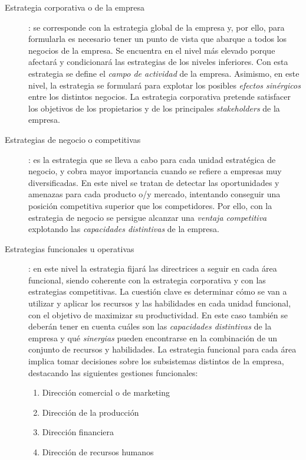 \documentclass[10pt,a4paper,spanish]{report}
\begin{document}
                  \begin{description}
                        \item[Estrategia corporativa o de la empresa]: se corresponde con la estrategia global de la empresa y, por ello, para formularla es necesario tener un punto de vista que abarque a todos los negocios de la empresa. Se encuentra en el nivel más elevado porque afectará y condicionará las estrategias de los niveles inferiores. Con esta estrategia se define el \textit{\textcolor[rgb]{0.4,0.9,0.6}{campo de actividad}} de la empresa. Asimismo, en este nivel, la estrategia se formulará para explotar los posibles \textit{\textcolor[rgb]{0.4,0.9,0.6}{efectos sinérgicos}} entre los distintos negocios. La estrategia corporativa pretende satisfacer los objetivos de los propietarios y de los principales \textit{\textcolor[rgb]{0.4,0.9,0.6}{stakeholders}} de la empresa.

                        \item[Estrategias de negocio o competitivas]: es la estrategia que se lleva a cabo para cada unidad estratégica de negocio, y cobra mayor importancia cuando se refiere a empresas muy diversificadas. En este nivel se tratan de detectar las oportunidades y amenazas para cada producto o/y mercado, intentando conseguir una posición competitiva superior que los competidores. Por ello, con la estrategia de negocio se persigue alcanzar una \textit{\textcolor[rgb]{0.4,0.9,0.6}{ventaja competitiva}} explotando las \textit{\textcolor[rgb]{0.4,0.9,0.6}{capacidades distintivas}} de la empresa.

                        \item[Estrategias funcionales u operativas]: en este nivel la estrategia fijará las directrices a seguir en cada área funcional, siendo coherente con la estrategia corporativa y con las estrategias competitivas. La cuestión clave es determinar cómo se van a utilizar y aplicar los recursos y las habilidades en cada unidad funcional, con el objetivo de maximizar su productividad. En este caso también se deberán tener en cuenta cuáles son las \textit{\textcolor[rgb]{0.4,0.9,0.6}{capacidades distintivas}} de la empresa y qué \textit{\textcolor[rgb]{0.4,0.9,0.6}{sinergias}} pueden encontrarse en la combinación de un conjunto de recursos y habilidades. La estrategia funcional para cada área implica tomar decisiones sobre los subsistemas distintos de la empresa, destacando las siguientes gestiones funcionales:
                        \begin{enumerate}
                              \item Dirección comercial o de marketing
                              \item Dirección de la producción
                              \item Dirección financiera
                              \item Dirección de recursos humanos
                        \end{enumerate}
                  \end{description}
\end{document}
